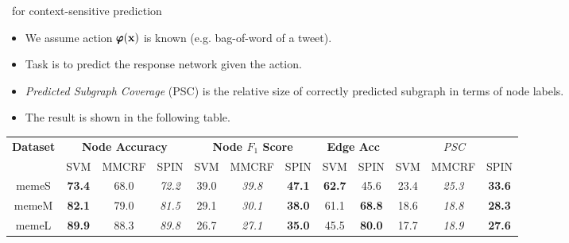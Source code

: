\documentclass[first=dgreen,second=purple,logo=red]{aaltoslides}
\begin{document}
\begin{frame}{\spin\ for context-sensitive prediction}
	\begin{itemize}\footnotesize
		\item We assume action $\pmb \varphi(\mathbf {x})$ is known (e.g. bag-of-word of a tweet).
		\item Task is to predict the response network given the action.
		\item {\em Predicted Subgraph Coverage} (PSC) is the relative size of correctly predicted subgraph in terms of node labels.
		\item The result is shown in the following table.
	\end{itemize}	
		\begin{table}[t]
		\scriptsize
		\centering
		\begin{tabular}{|@{  }c@{  }|@{}c@{  }c@{  }c@{}|@{}c@{  }c@{  }c@{}|@{}c@{ }c@{}|@{}c@{  }c@{  }c@{}|}
		  \hline
		\multirow{2}{*}{\textbf{Dataset}} & \multicolumn{3}{c}{\textbf{Node Accuracy}} & \multicolumn{3}{|c}{\textbf{Node $F_1$ Score}} & \multicolumn{2}{|c}{\textbf{Edge Acc}} & \multicolumn{3}{|c|}{{\em PSC}}  \\ \cline{2-12}
		 & \scriptsize{SVM} & \scriptsize{MMCRF} & \scriptsize{SPIN} & \scriptsize{SVM} & \scriptsize{MMCRF} & \scriptsize{SPIN} & \scriptsize{SVM}  & \scriptsize{SPIN}  & \scriptsize{SVM} & \scriptsize{MMCRF} & \scriptsize{SPIN}  \\ \hline
		   memeS  & \textbf{73.4} & {68.0} & \em{72.2} & {39.0} & \em{39.8} & \textbf{47.1} & \textbf{62.7} & {45.6} & {23.4} & \em{25.3} & \textbf{33.6} \\ 
		   memeM  & \textbf{82.1} & {79.0} & \em{81.5} & {29.1} & \em{30.1} & \textbf{38.0} & {61.1} & \textbf{68.8} & {18.6} & \em{18.8} & \textbf{28.3} \\ 
		   memeL  & \textbf{89.9} & {88.3} & \em{89.8} & {26.7} & \em{27.1} & \textbf{35.0} & {45.5} & \textbf{80.0} & {17.7} & \em{18.9} & \textbf{27.6} \\ 

\end{tabular}
\end{table}
\end{frame}
\end{document}
